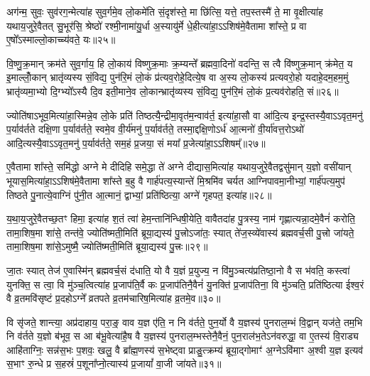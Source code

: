{\anuvakamend[{इत्ये॒तद॑वभृ॒थो दिशः॑ स॒प्त च॑॥५॥}]}

अग॑न्म॒ सुवः॒ सुव॑रग॒न्मेत्या॑ह सुव॒र्गमे॒व लो॒कमे॑ति सं॒दृश॑स्ते॒ मा छि॑त्सि॒ यत्ते॒ तप॒स्तस्मै॑ ते॒ मा वृ॒क्षीत्या॑ह यथाय॒जुरे॒वैतत् सु॒भूर॑सि॒ श्रेष्ठो॑ रश्मी॒नामा॑यु॒र्धा अ॒स्यायु॑र्मे धे॒हीत्या॑हा॒\-ऽ\-ऽशिष॑मे॒वैतामा शा᳚स्ते॒ प्र वा ए॒षो᳚\-ऽस्माल्लो॒काच्च्य॑वते॒ यः॥२५॥

वि॒ष्णु॒क्र॒मान् क्रम॑ते सुव॒र्गाय॒ हि लो॒काय॑ विष्णुक्र॒माः क्र॒म्यन्ते᳚ ब्रह्मवा॒दिनो॑ वदन्ति॒ स त्वै वि॑ष्णुक्र॒मान् क्र॑मेत॒ य इ॒माल्लोँ॒कान् भ्रातृ॑व्यस्य सं॒विद्य॒ पुन॑रि॒मं लो॒कं प्र॑त्यव॒रोहे॒दित्ये॒ष वा अ॒स्य लो॒कस्य॑ प्रत्यवरो॒हो यदाहे॒दम॒हम॒मुं भ्रातृ॑व्यमा॒भ्यो दि॒ग्भ्यो᳚\-ऽस्यै दि॒व इती॒माने॒व लो॒कान्भ्रातृ॑व्यस्य सं॒विद्य॒ पुन॑रि॒मं लो॒कं प्र॒त्यव॑रोहति॒ सं॥२६॥

ज्योति॑षा\-ऽभूव॒मित्या॑हा॒स्मिन्ने॒व लो॒के प्रति॑ तिष्ठत्यै॒न्द्रीमा॒वृत॑म॒न्वाव॑र्त॒ इत्या॑हा॒सौ वा आ॑दि॒त्य इन्द्र॒स्तस्यै॒वा\-ऽ\-ऽ\-वृत॒मनु॑ प॒र्याव॑र्तते दक्षि॒णा प॒र्याव॑र्तते॒ स्वमे॒व वी॒र्य॑मनु॑ प॒र्याव॑र्तते॒ तस्मा॒द्दक्षि॒णो\-ऽर्ध॑ आ॒त्मनो॑ वी॒र्या॑वत्त॒रो\-ऽथो॑ आदि॒त्यस्यै॒वा\-ऽ\-ऽवृत॒मनु॑ प॒र्याव॑र्तते॒ सम॒हं प्र॒जया॒ सं मया᳚ प्र॒जेत्या॑हा॒\-ऽ\-ऽशिषम्᳚॥२७॥

ए॒वैतामा शा᳚स्ते॒ समि॑द्धो अग्ने मे दीदिहि समे॒द्धा ते॑ अग्ने दीद्यास॒मित्या॑ह यथाय॒जुरे॒वैतद्वसु॑मान् य॒ज्ञो वसी॑यान् भूयास॒मित्या॑हा॒\-ऽ\-ऽशिष॑मे॒वैतामा शा᳚स्ते ब॒हु वै गार्\mbox{}ह॑पत्य॒स्यान्ते॑ मि॒श्रमि॑व चर्यत आग्निपावमा॒नीभ्यां॒ गार्\mbox{}ह॑पत्य॒मुप॑ तिष्ठते पु॒नात्ये॒वाग्निं पु॑नी॒त आ॒त्मानं॒ द्वाभ्यां॒ प्रति॑ष्ठित्या॒ अग्ने॑ गृहपत॒ इत्या॑ह॥२८॥

य॒था॒य॒जुरे॒वैतच्छ॒तꣳ हिमा॒ इत्या॑ह श॒तं त्वा॑ हेम॒न्तानि॑न्धिषी॒येति॒ वावैतदा॑ह पु॒त्रस्य॒ नाम॑ गृह्णात्यन्ना॒दमे॒वैनं॑ करोति॒ तामा॒शिष॒मा शा॑से॒ तन्त॑वे॒ ज्योति॑ष्मती॒मिति॑ ब्रूया॒द्यस्य॑ पु॒त्त्रो\-ऽजा॑तः॒ स्यात् ते॑ज॒स्व्ये॑वास्य॑ ब्रह्मवर्च॒सी पु॒त्त्रो जा॑यते॒ तामा॒शिष॒मा शा॑से॒\-ऽमुष्मै॒ ज्योति॑ष्मती॒मिति॑ ब्रूया॒द्यस्य॑ पु॒त्त्रः॥२९॥

जा॒तः स्यात् तेज॑ ए॒वास्मि॑न् ब्रह्मवर्च॒सं द॑धाति॒ यो वै य॒ज्ञं प्र॒युज्य॒ न वि॑मु॒ञ्चत्य॑प्रतिष्ठा॒नो वै स भ॑वति॒ कस्त्वा॑ युनक्ति॒ स त्वा॒ वि मु॑ञ्च॒त्वित्या॑ह प्र॒जाप॑ति॒र्वै कः प्र॒जाप॑तिनै॒वैनं॑ यु॒नक्ति॑ प्र॒जाप॑तिना॒ वि मु॑ञ्चति॒ प्रति॑ष्ठित्या ईश्व॒रं वै व्र॒तमवि॑सृष्टं प्र॒दहो\-ऽग्ने᳚ व्रतपते व्र॒तम॑चारिष॒मित्या॑ह व्र॒तमे॒व॥३०॥

वि सृ॑जते॒ शान्त्या॒ अप्र॑दाहाय॒ परा॒ङ्॒ वाव य॒ज्ञ ए॑ति॒ न नि व॑र्तते॒ पुन॒र्यो वै य॒ज्ञस्य॑ पुनराल॒म्भं वि॒द्वान् यज॑ते॒ तम॒भि नि व॑र्तते य॒ज्ञो ब॑भूव॒ स आ ब॑भू॒वेत्या॑है॒ष वै य॒ज्ञस्य॑ पुनराल॒म्भस्तेनै॒वैनं॒ पुन॒राल॑भ॒ते\-ऽन॑वरुद्धा॒ वा ए॒तस्य॑ वि॒राड्य आहि॑ताग्निः॒ सन्न॑स॒भः प॒शवः॒ खलु॒ वै ब्रा᳚ह्म॒णस्य॑ स॒भेष्ट्वा प्राङु॒त्क्रम्य॑ ब्रूया॒द्गोमाꣳ॑ अ॒ग्ने\-ऽवि॑माꣳ अ॒श्वी य॒ज्ञ इत्यव॑ स॒भाꣳ रु॒न्धे प्र स॒हस्रं॑ प॒शूना᳚प्नो॒त्यास्य॑ प्र॒जायां᳚ वा॒जी जा॑यते॥३१॥

